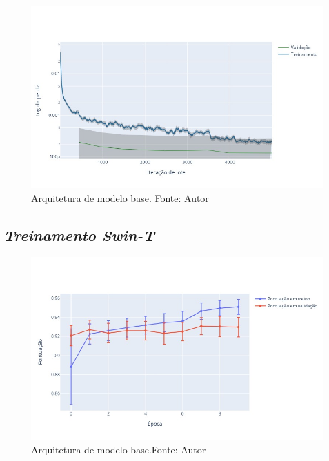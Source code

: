 \begin{figure}[!ht]
    \centering
    \includegraphics[width=\columnwidth]{Imagens/results/rsp-resnet-50_planet_pt/Training Loss Per Minibatch.jpg}
    \caption{ Arquitetura de modelo base. Fonte: Autor}
    \label{fig:TreinoResnetPerda}
\end{figure}


\subsection{\textit{Treinamento Swin-T}}\label{sec:Cap3_TrainSwinT}


\begin{figure}[!ht]
    \centering
    \includegraphics[width=\columnwidth]{Imagens/results/rsp-swin-t_planet_pt/pontuação em treino e validação por época.jpg}
    \caption{ Arquitetura de modelo base.Fonte: Autor}
    \label{fig:PontuacaoTrainSwin}
\end{figure}  

